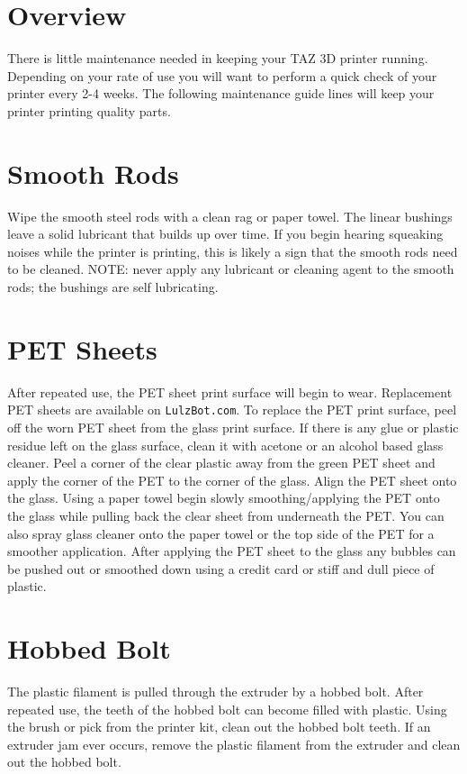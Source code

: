 \section{Overview}
There is little maintenance needed in keeping your TAZ 3D printer running. Depending on your rate of use you will want to perform a quick check of your printer every 2-4 weeks. The following maintenance guide lines will keep your printer printing quality parts.

\section{Smooth Rods}
Wipe the smooth steel rods with a clean rag or paper towel. The linear bushings leave a solid lubricant that builds up over time. If you begin hearing squeaking noises while the printer is printing, this is likely a sign that the smooth rods need to be cleaned. NOTE: never apply any lubricant or cleaning agent to the smooth rods; the bushings are self lubricating.

\section{PET Sheets}
After repeated use, the PET sheet print surface will begin to wear. Replacement PET sheets are available on \texttt{LulzBot.com}. To replace the PET print surface, peel off the worn PET sheet from the glass print surface. If there is any glue or plastic residue left on the glass surface, clean it with acetone or an alcohol based glass cleaner. Peel a corner of the clear plastic away from the green PET sheet and apply the corner of the PET to the corner of the glass. Align the PET sheet onto the glass. Using a paper towel begin slowly smoothing/applying the PET onto the glass while pulling back the clear sheet from underneath the PET. You can also spray glass cleaner onto the paper towel or the top side of the PET for a smoother application. After applying the PET sheet to the glass any bubbles can be pushed out or smoothed down using a credit card or stiff and dull piece of plastic.

\section{Hobbed Bolt}
The plastic filament is pulled through the extruder by a hobbed bolt. After repeated use, the teeth of the hobbed bolt can become filled with plastic. Using the brush or pick from the printer kit, clean out the hobbed bolt teeth. If an extruder jam ever occurs, remove the plastic filament from the extruder and clean out the hobbed bolt.

